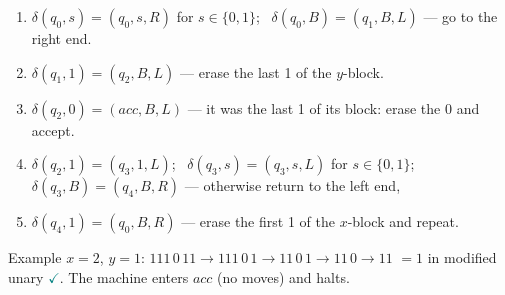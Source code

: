 \documentclass[11pt,a4paper]{article}
\newcommand{\ok}{\textcolor{teal}{\ensuremath{\checkmark}}}
\begin{document}
\begin{solution}
{\begin{enumerate}[label=\arabic*.,itemsep=0pt]
\item $\delta(q_0,s)=(q_0,s,R)$ for $s\in\{0,1\}$; \ $\delta(q_0,B)=(q_1,B,L)$ --- go to the right end.
\item $\delta(q_1,1)=(q_2,B,L)$ --- erase the last 1 of the $y$-block.
\item $\delta(q_2,0)=(acc,B,L)$ --- it was the last 1 of its block: erase the 0 and accept.
\item $\delta(q_2,1)=(q_3,1,L)$; \ $\delta(q_3,s)=(q_3,s,L)$ for $s\in\{0,1\}$; \ $\delta(q_3,B)=(q_4,B,R)$ --- otherwise return to the left end,
\item $\delta(q_4,1)=(q_0,B,R)$ --- erase the first 1 of the $x$-block and repeat.
\end{enumerate}}
Example $x=2$, $y=1$: $111\,0\,11\to111\,0\,1\to11\,0\,1\to11\,0\to11$ $=1$ in modified unary \ok. The machine enters $acc$ (no moves) and halts.
\end{solution}
\end{document}
